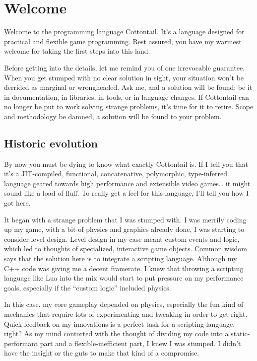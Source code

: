 \chapter{Welcome}

Welcome to the programming language Cottontail. It's a language
designed for practical and flexible game programming. Rest assured,
you have my warmest welcome for taking the first steps into this land.

Before getting into the details, let me remind you of one irrevocable
guarantee. When you get stumped with no clear solution in sight, your
situation won't be derrided as marginal or wrongheaded. Ask me, and a
solution will be found; be it in documentation, in libraries, in
tools, or in language changes. If Cottontail can no longer be put to
work solving strange problems, it's time for it to retire. Scope and
methodology be damned, a solution will be found to your problem.


\section{Historic evolution}

By now you must be dying to know what exactly Cottontail is. If I tell
you that it's a JIT-compiled, functional, concatenative, polymorphic,
type-inferred language geared towards high performance and extensible
video games\ldots{} it might sound like a load of fluff. To really get
a feel for this language, I'll tell you how I got here.

It began with a strange problem that I was stumped with. I was merrily
coding up my game, with a bit of physics and graphics already done, I
was starting to consider level design. Level design in my case meant
custom events and logic, which led to thoughts of specialized,
interactive game objects. Common wisdom says that the solution here is
to integrate a scripting language. Although my C++ code was giving me
a decent framerate, I knew that throwing a scripting language like Lua
into the mix would start to put pressure on my performance goals,
especially if the ``custom logic'' included physics.

In this case, my core gameplay depended on physics, especially the fun
kind of mechanics that require lots of experimenting and tweaking in
order to get right. Quick feedback on my innovations is a perfect task
for a scripting language, right? As my mind contorted with the thought
of dividing my code into a static-performant part and a
flexible-inefficient part, I knew I was stumped. I didn't have the
insight or the guts to make that kind of a compromise.

